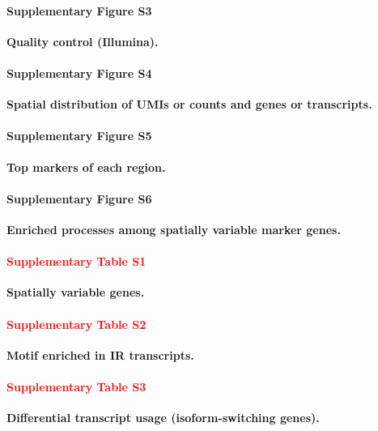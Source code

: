\documentclass[utf8]{FrontiersinHarvard} %
\newcommand*{\red}{\textcolor{red}}
\begin{document}
\paragraph*{Supplementary Figure S3}
\label{fig:S3}
{\bf Quality control (Illumina).}

\paragraph*{Supplementary Figure S4}
\label{fig:S4}
{\bf Spatial distribution of UMIs or counts and genes or transcripts.}

\paragraph*{Supplementary Figure S5}
\label{fig:S5}
{\bf Top markers of each region.}

\paragraph*{Supplementary Figure S6}
\label{fig:S6}
{\bf Enriched processes among spatially variable marker genes.}


\paragraph*{\red{Supplementary Table S1}}
\label{tab:tabS1}
{\bf Spatially variable genes.}

\paragraph*{\red{Supplementary Table S2}}
\label{tab:tabS2}
{\bf Motif enriched in IR transcripts.}

\paragraph*{\red{Supplementary Table S3}}
\label{tab:tabS3}
{\bf Differential transcript usage (isoform-switching genes).}


\end{document}

